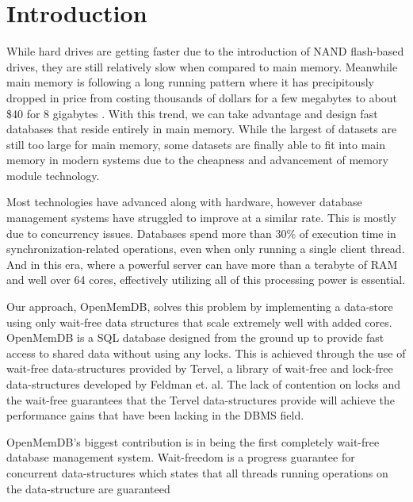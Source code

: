 \documentclass[conference, compsoc]{IEEEtran}
\begin{document}
\section{Introduction}
While hard drives are getting faster due to the introduction of NAND flash-based drives,
they are still relatively slow when compared to main memory. Meanwhile main memory is 
following a long running pattern where it has precipitously dropped in price from costing 
thousands of dollars for a few megabytes to about \$40 for 8 gigabytes \cite{jcmit}. 
With this trend, we can take advantage and design fast databases that reside entirely in main memory. While the largest of datasets are still too large for main memory, 
some datasets are finally able to fit into main memory in modern systems due to the 
cheapness and advancement of memory module technology. 
\par\vspace{\baselineskip}
Most technologies have advanced 
along with hardware, however database management systems have struggled to improve
at a similar rate. This is mostly due to concurrency issues. Databases spend more than 30\% 
of execution time in synchronization-related operations, even when only running a single
client thread\cite{soares2015database}. And in this era, where a powerful server
can have more than a terabyte of RAM and well over 64 cores, effectively utilizing all of 
this processing power is essential. 
\par\vspace{\baselineskip}
Our approach, OpenMemDB, solves this problem by implementing a data-store 
using only wait-free data structures that scale extremely well with added cores. 
OpenMemDB is a SQL database designed from the ground up to provide fast access to shared
data without using any locks. This is achieved through the use of wait-free
data-structures provided by Tervel, a library of wait-free and lock-free data-structures
developed by Feldman et. al\cite{tervel:hazard_pointer}\cite{tervel:hash_map}\cite{tervel:vector}. The lack of contention on locks and the wait-free
guarantees that the Tervel data-structures provide will achieve the performance gains that 
have been lacking in the DBMS field. 
\par\vspace{\baselineskip}
OpenMemDB's biggest contribution is in being the first completely wait-free database 
management system. Wait-freedom is a progress guarantee for concurrent data-structures 
which states that all threads running operations on the data-structure are guaranteed 
\end{document}
